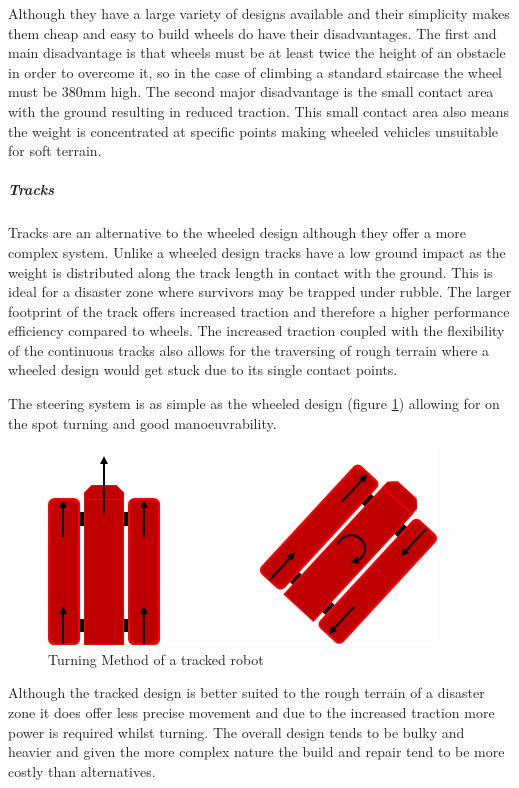 Although they have a large variety of designs available and their simplicity makes them cheap and easy to build wheels do have their disadvantages. The first and main disadvantage is that wheels must be at least twice the height of an obstacle in order to overcome it, so in the case of climbing a standard staircase the wheel must be 380mm high. The second major disadvantage is the small contact area with the ground resulting in reduced traction. This small contact area also means the weight is concentrated at specific points making wheeled vehicles unsuitable for soft terrain.\par

\subparagraph*{Tracks}

Tracks are an alternative to the wheeled design although they offer a more complex system. Unlike a wheeled design tracks have a low ground impact as the weight is distributed along the track length in contact with the ground. This is ideal for a disaster zone where survivors may be trapped under rubble. The larger footprint of the track offers increased traction and therefore a higher performance efficiency compared to wheels. The increased traction coupled with the flexibility of the continuous tracks also allows for the traversing of rough terrain where a wheeled design would get stuck due to its single contact points.\par

The steering system is as simple as the wheeled design (figure \ref{fig:trackturn}) allowing for on the spot turning and good manoeuvrability.\par

\begin{figure}[h]
\centering\includegraphics[width=0.6\linewidth]{Images/DT_Fig_7.png}
\caption{Turning Method of a tracked robot}
\label{fig:trackturn}
\end{figure}

Although the tracked design is better suited to the rough terrain of a disaster zone it does offer less precise movement and due to the increased traction more power is required whilst turning. The overall design tends to be bulky and heavier and given the more complex nature the build and repair tend to be more costly than alternatives.\par

